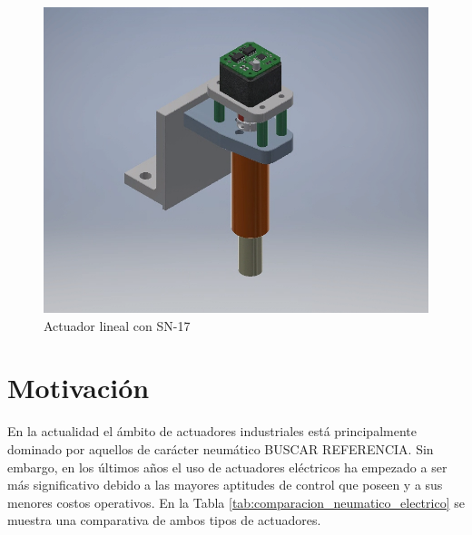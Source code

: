 \begin{figure}[htbp]
	\centering
	\includegraphics[scale=.6]{./Figures/Prensador-N17.PNG}
	\caption{Actuador lineal con SN-17}
	\label{fig:aplicacionSN17}
\end{figure}


\section{Motivación}

En la actualidad el ámbito de actuadores industriales está principalmente dominado por aquellos de carácter neumático BUSCAR REFERENCIA. Sin embargo, en los últimos años el uso de actuadores eléctricos ha empezado a ser más significativo debido a las mayores aptitudes de control que poseen y a sus menores costos operativos\citep{web_comparacion_actuadores}. En la Tabla \ref{tab:comparacion_neumatico_electrico} se muestra una comparativa de ambos tipos de actuadores.

